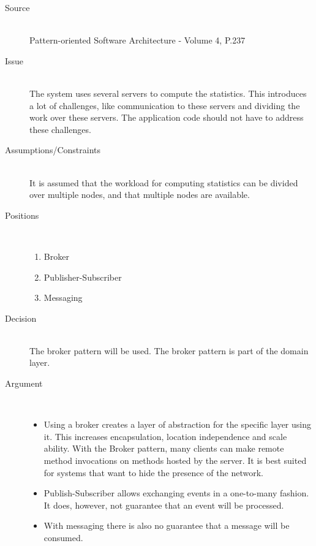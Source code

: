 \begin{description}
\item [Source]~\\
Pattern-oriented Software Architecture - Volume 4, P.237 \cite{wiley-4}

\item [Issue]~\\
The system uses several servers to compute the statistics. This introduces a lot of challenges, like communication to these servers and dividing the work over these servers. The application code should not have to address these challenges.

\item [Assumptions/Constraints]~\\
It is assumed that the workload for computing statistics can be divided over multiple nodes, and that multiple nodes are available.

\item [Positions]~
\begin{enumerate}
\item Broker 
\item Publisher-Subscriber
\item Messaging
\end{enumerate}


\item [Decision]~\\
The broker pattern will be used. The broker pattern is part of the domain layer.

\item [Argument]~\\
\begin{itemize}
\item Using a broker creates a layer of abstraction for the specific layer using it. This increases encapsulation, location independence and scale ability. With the Broker pattern, many clients can make remote method invocations on methods hosted by the server. It is best suited for systems that want to hide the presence of the network.

\item Publish-Subscriber allows exchanging events in a one-to-many fashion. It does, however, not guarantee that an event will be processed.

\item With messaging there is also no guarantee that a message will be consumed. 
\end{itemize}



\end{description}
